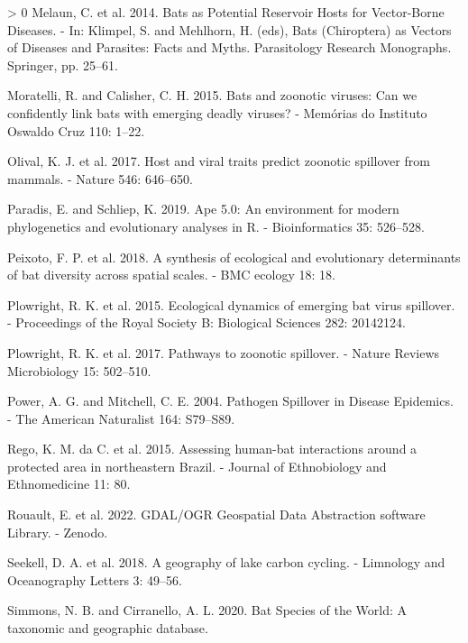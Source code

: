 \documentclass[11pt]{article}
\newlength{\cslhangindent}
\newenvironment{CSLReferences}[3] %
 {%
  \setlength{\parindent}{0pt}
  \ifodd #1 \everypar{\setlength{\hangindent}{\cslhangindent}}\ignorespaces\fi
  \ifnum #2 > 0
  \setlength{\parskip}{#2\baselineskip}
  \fi
 }%
 {}
\begin{document}
\begin{CSLReferences}{1}{0}
\leavevmode\hypertarget{ref-Melaun2014BatPot}{}%
Melaun, C. et al. 2014. Bats as Potential Reservoir Hosts for
Vector-Borne Diseases. - In: Klimpel, S. and Mehlhorn, H. (eds), Bats
(Chiroptera) as Vectors of Diseases and Parasites: Facts and Myths.
Parasitology Research Monographs. Springer, pp. 25--61.

\leavevmode\hypertarget{ref-Moratelli2015BatZoo}{}%
Moratelli, R. and Calisher, C. H. 2015. Bats and zoonotic viruses: Can
we confidently link bats with emerging deadly viruses? - Memórias do
Instituto Oswaldo Cruz 110: 1--22.

\leavevmode\hypertarget{ref-Olival2017HosVir}{}%
Olival, K. J. et al. 2017. Host and viral traits predict zoonotic
spillover from mammals. - Nature 546: 646--650.

\leavevmode\hypertarget{ref-Paradis2019ApeEnv}{}%
Paradis, E. and Schliep, K. 2019. Ape 5.0: An environment for modern
phylogenetics and evolutionary analyses in R. - Bioinformatics 35:
526--528.

\leavevmode\hypertarget{ref-Peixoto2018SynEco}{}%
Peixoto, F. P. et al. 2018. A synthesis of ecological and evolutionary
determinants of bat diversity across spatial scales. - BMC ecology 18:
18.

\leavevmode\hypertarget{ref-Plowright2015EcoDyn}{}%
Plowright, R. K. et al. 2015. Ecological dynamics of emerging bat virus
spillover. - Proceedings of the Royal Society B: Biological Sciences
282: 20142124.

\leavevmode\hypertarget{ref-Plowright2017PatZoo}{}%
Plowright, R. K. et al. 2017. Pathways to zoonotic spillover. - Nature
Reviews Microbiology 15: 502--510.

\leavevmode\hypertarget{ref-Power2004PatSpi}{}%
Power, A. G. and Mitchell, C. E. 2004. Pathogen Spillover in Disease
Epidemics. - The American Naturalist 164: S79--S89.

\leavevmode\hypertarget{ref-Rego2015AssHum}{}%
Rego, K. M. da C. et al. 2015. Assessing human-bat interactions around a
protected area in northeastern Brazil. - Journal of Ethnobiology and
Ethnomedicine 11: 80.

\leavevmode\hypertarget{ref-RouaultEven2022GdaOgr}{}%
Rouault, E. et al. 2022. GDAL/OGR Geospatial Data Abstraction software
Library. - Zenodo.

\leavevmode\hypertarget{ref-Seekell2018GeoLak}{}%
Seekell, D. A. et al. 2018. A geography of lake carbon cycling. -
Limnology and Oceanography Letters 3: 49--56.

\leavevmode\hypertarget{ref-Simmons2020BatSpe}{}%
Simmons, N. B. and Cirranello, A. L. 2020. Bat Species of the World: A
taxonomic and geographic database.


\end{CSLReferences}
\end{document}
